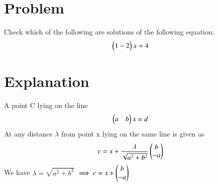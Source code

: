 \documentclass[journal,12pt,twocolumn]{IEEEtran}
\begin{document}
\section{Problem}
Check which of the following are solutions of the following equation:
\begin{align} \begin{pmatrix}1 -2\end{pmatrix}x = 4\end{align}
\section{Explanation}\label{Explanation}
A point C lying on the line 
\begin{align}
    \begin{pmatrix}a & b\end{pmatrix}x = d
\end{align}
At any distance $\lambda$ from point x lying on the same line is given as 
\begin{align}
    c = x + \frac{\lambda}{\sqrt{a^2+b^2}}\begin{pmatrix}b \\ -a\end{pmatrix}
\end{align}
We have $\lambda = \sqrt{a^2+b^2}$ 
$\implies c = x + \begin{pmatrix}b \\ -a\end{pmatrix}$
\end{document}
